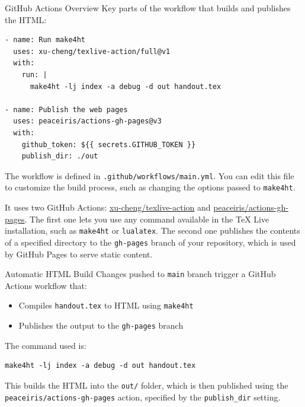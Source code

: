 \begin{frame}[fragile]{GitHub Actions Overview}
Key parts of the workflow that builds and publishes the HTML:

\begin{verbatim}
- name: Run make4ht
  uses: xu-cheng/texlive-action/full@v1
  with:
    run: |
      make4ht -lj index -a debug -d out handout.tex

- name: Publish the web pages
  uses: peaceiris/actions-gh-pages@v3
  with:
    github_token: ${{ secrets.GITHUB_TOKEN }}
    publish_dir: ./out
\end{verbatim}

\end{frame}


The workflow is defined in \texttt{.github/workflows/main.yml}.
You can edit this file to customize the build process, such as changing the options passed to \texttt{make4ht}.

It uses two GitHub Actions: \href{https://github.com/xu-cheng/texlive-action}{xu-cheng/texlive-action}
and \href{https://github.com/peaceiris/actions-gh-pages}{peaceiris/actions-gh-pages}.
The first one lets you use any command available in the TeX Live installation, such as \texttt{make4ht} or \texttt{lualatex}.
The second one publishes the contents of a specified directory to the \texttt{gh-pages} branch of your repository,
which is used by GitHub Pages to serve static content.



\begin{frame}[fragile]{Automatic HTML Build}
Changes pushed to \texttt{main} branch trigger a GitHub Actions workflow that:

\begin{itemize}
  \item Compiles \texttt{handout.tex} to HTML using \texttt{make4ht}
  \item Publishes the output to the \texttt{gh-pages} branch
\end{itemize}

The command used is:

\begin{verbatim}
make4ht -lj index -a debug -d out handout.tex
\end{verbatim}
\end{frame}


This builds the HTML into the \texttt{out/} folder, which is then published
using the \texttt{peaceiris/actions-gh-pages} action, specified by the
\texttt{publish\_dir} setting.


